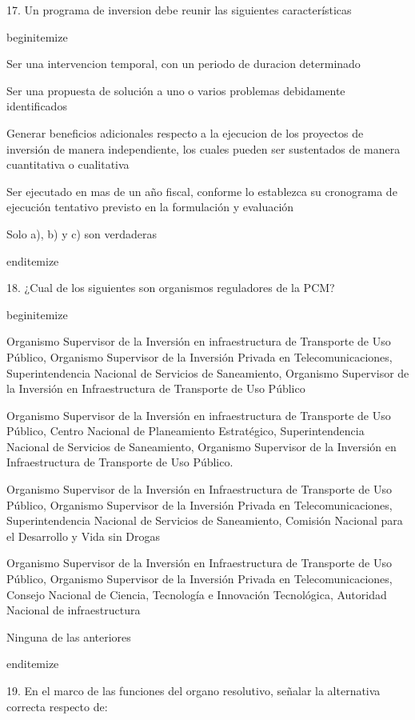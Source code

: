 17. Un programa de inversion debe reunir las siguientes características 

begin{itemize}
			\item Ser una intervencion temporal, con un periodo de duracion determinado
			\item Ser una propuesta de solución a uno o varios problemas debidamente identificados
			\item Generar beneficios adicionales respecto a la ejecucion de los proyectos de inversión de manera independiente, los cuales pueden ser sustentados de manera cuantitativa o cualitativa
			\item Ser ejecutado en mas de un año fiscal, conforme lo establezca su cronograma de ejecución tentativo previsto en la formulación y evaluación 
			\item Solo a), b) y c) son verdaderas

end{itemize}

18. ¿Cual de los siguientes son organismos reguladores de la PCM?

begin{itemize}
			\item Organismo Supervisor de la Inversión en infraestructura de Transporte de Uso Público, Organismo Supervisor de la Inversión Privada en Telecomunicaciones, Superintendencia Nacional de Servicios de Saneamiento, Organismo Supervisor de la Inversión en Infraestructura de Transporte de Uso Público
			\item Organismo Supervisor de la Inversión en infraestructura de Transporte de Uso Público, Centro Nacional de Planeamiento Estratégico, Superintendencia Nacional de Servicios de Saneamiento, Organismo Supervisor de la Inversión en Infraestructura de Transporte de Uso Público.
			\item Organismo Supervisor de la Inversión en Infraestructura de Transporte de Uso Público, Organismo Supervisor de la Inversión Privada en Telecomunicaciones, Superintendencia Nacional de Servicios de Saneamiento, Comisión Nacional para el Desarrollo y Vida sin Drogas
			\item Organismo Supervisor de la Inversión en Infraestructura de Transporte de Uso Público, Organismo Supervisor de la Inversión Privada en Telecomunicaciones, Consejo Nacional de Ciencia, Tecnología e Innovación Tecnológica, Autoridad Nacional de infraestructura 
			\item Ninguna de las anteriores

end{itemize}

19. En el marco de las funciones del organo resolutivo, señalar la alternativa correcta respecto de:

